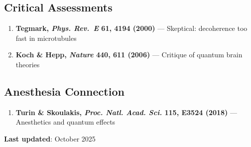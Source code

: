 \subsection{Critical Assessments}\label{critical-assessments}

\begin{enumerate}
\def\labelenumi{\arabic{enumi}.}
\setcounter{enumi}{6}

\item
  \textbf{Tegmark, \emph{Phys. Rev.~E} 61, 4194 (2000)} ---
  Skeptical: decoherence too fast in microtubules
\item
  \textbf{Koch \& Hepp, \emph{Nature} 440, 611 (2006)} --- Critique
  of quantum brain theories
\end{enumerate}

\subsection{Anesthesia Connection}\label{anesthesia-connection}

\begin{enumerate}
\def\labelenumi{\arabic{enumi}.}
\setcounter{enumi}{8}

\item
  \textbf{Turin \& Skoulakis, \emph{Proc. Natl. Acad. Sci.} 115, E3524
  (2018)} --- Anesthetics and quantum effects
\end{enumerate}



\textbf{Last updated}: October 2025
